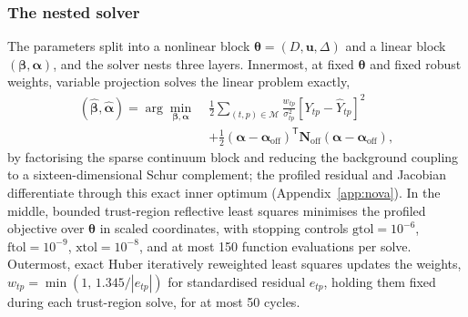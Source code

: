 \subsubsection{The nested solver}


The parameters split into a nonlinear block
$\bm{\theta}=(D,\bm{u},\Delta)$ and a linear block
$(\bm{\beta},\bm{\alpha})$, and the solver nests three layers. Innermost,
at fixed $\bm{\theta}$ and fixed robust weights, variable projection
\citep{GolubPereyra1973} solves the linear problem exactly,
\begin{equation}
\begin{split}
 (\widehat{\bm{\beta}},\widehat{\bm{\alpha}})=
 \arg\min_{\bm{\beta},\bm{\alpha}}\;
 &\frac{1}{2}\sum_{(t,p)\in\mathcal{M}}\frac{w_{tp}}{\sigma_{tp}^2}
 \left[Y_{tp}-\widehat Y_{tp}\right]^2 \\
 &+\frac{1}{2}(\bm{\alpha}-\bm{\alpha}_{\mathrm{off}})^{\mathsf T}
   \bm{N}_{\mathrm{off}}(\bm{\alpha}-\bm{\alpha}_{\mathrm{off}}),
\end{split}
 \label{eq:varpro}
\end{equation}
by factorising the sparse continuum block and reducing the background
coupling to a sixteen-dimensional Schur complement; the profiled residual
and Jacobian differentiate through this exact inner optimum
(Appendix~\ref{app:nova}). In the middle, bounded trust-region reflective
least squares \citep{BranchColemanLi1999} minimises the profiled
objective over $\bm{\theta}$ in scaled coordinates, with stopping
controls $\mathrm{gtol}=10^{-6}$, $\mathrm{ftol}=10^{-9}$,
$\mathrm{xtol}=10^{-8}$, and at most 150 function evaluations per solve.
Outermost, exact Huber iteratively reweighted least squares
\citep{Huber1964} updates the weights,
$w_{tp}=\min(1,\,1.345/|e_{tp}|)$ for standardised residual $e_{tp}$,
holding them fixed during each trust-region solve, for at most 50 cycles.

